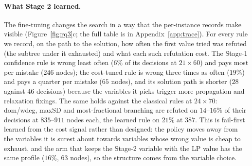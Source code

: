 \documentclass[final,5p,times,twocolumn,authoryear]{elsarticle}
\begin{document}
\paragraph{What Stage 2 learned.} The fine-tuning changes the search in a way that the per-instance records make visible (Figure~\ref{fig:rq3}c; the full table is in Appendix~\ref{app:trace}). For every rule we record, on the path to the solution, how often the first value tried was refuted (the subtree under it exhausted) and what each such refutation cost. The Stage-1 confidence rule is wrong least often ($6\%$ of its decisions at $21\times60$) and pays most per mistake ($246$ nodes); the cost-tuned rule is wrong three times as often ($19\%$) and pays a quarter per mistake ($65$ nodes), and its solution path is shorter ($28$ against $46$ decisions) because the variables it picks trigger more propagation and relaxation fixings. The same holds against the classical rules at $24\times70$: dom/wdeg, maxSD and most-fractional branching are refuted on $14$--$16\%$ of their decisions at $835$--$911$ nodes each, the learned rule on $21\%$ at $387$. This is fail-first \citep{haralick1980increasing} learned from the cost signal rather than designed: the policy moves away from the variables it is surest about towards variables whose wrong value is cheap to exhaust, and the arm that keeps the Stage-2 variable with the LP value has the same profile ($16\%$, $63$ nodes), so the structure comes from the variable choice.


\end{document}

